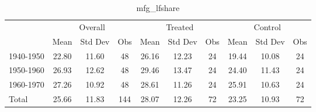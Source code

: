 \begin{table}[htbp]\centering
\def\sym#1{\ifmmode^{#1}\else\(^{#1}\)\fi}
\caption{mfg\_lfshare \label{tab1}}
\begin{tabular}{l*{3}{ccc}}
\toprule
                    &\multicolumn{3}{c}{Overall}           &\multicolumn{3}{c}{Treated}           &\multicolumn{3}{c}{Control}           \\
                    &        Mean&     Std Dev&         Obs&        Mean&     Std Dev&         Obs&        Mean&     Std Dev&         Obs\\
\midrule
1940-1950           &       22.80&       11.60&          48&       26.16&       12.23&          24&       19.44&       10.08&          24\\
1950-1960           &       26.93&       12.62&          48&       29.46&       13.47&          24&       24.40&       11.43&          24\\
1960-1970           &       27.26&       10.92&          48&       28.61&       11.26&          24&       25.91&       10.63&          24\\
Total               &       25.66&       11.83&         144&       28.07&       12.26&          72&       23.25&       10.93&          72\\
\bottomrule
\end{tabular}
\end{table}
